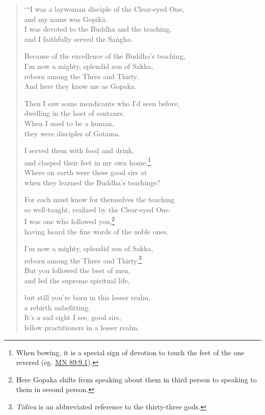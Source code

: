 \documentclass[12pt,openany]{book}%
\begin{document}
\begin{verse}%
‘“I was a laywoman disciple of the Clear-eyed One, \\
and my name was \textsanskrit{Gopikā}. \\
I was devoted to the Buddha and the teaching, \\
and I faithfully served the \textsanskrit{Saṅgha}. 

Because of the excellence of the Buddha’s teaching, \\
I’m now a mighty, splendid son of Sakka, \\
reborn among the Three and Thirty. \\
And here they know me as Gopaka. 

Then I saw some mendicants who I’d seen before, \\
dwelling in the host of centaurs. \\
When I used to be a human, \\
they were disciples of Gotama. 

I served them with food and drink, \\
and clasped their feet in my own home.\footnote{When bowing, it is a special sign of devotion to touch the feet of the one revered (eg. \href{https://suttacentral.net/mn89/en/sujato\#9.1}{MN 89:9.1}). } \\
Where on earth were these good sirs at \\
when they learned the Buddha’s teachings? 

For each must know for themselves the teaching \\
so well-taught, realized by the Clear-eyed One. \\
I was one who followed you,\footnote{Here Gopaka shifts from speaking about them in third person to speaking to them in second person. } \\
having heard the fine words of the noble ones. 

I’m now a mighty, splendid son of Sakka, \\
reborn among the Three and Thirty.\footnote{\textit{Tidiva} is an abbreviated reference to the thirty-three gods. } \\
But you followed the best of men, \\
and led the supreme spiritual life, 

but still you’re born in this lesser realm, \\
a rebirth unbefitting. \\
It’s a sad sight I see, good sirs, \\
fellow practitioners in a lesser realm. 


\end{verse}
\end{document}
